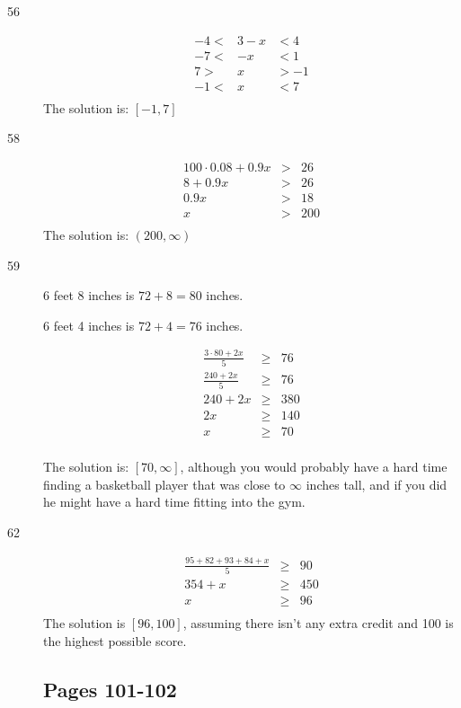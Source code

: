 \documentclass[fleqn,addpoints]{exam}
\begin{document}
\begin{description}
\item[56]
\begin{eqnarray*}
  -4 < & 3 - x & < 4 \\
  -7 < & -x & < 1 \\
  7 >  & x & > -1 \\
  -1 < & x & < 7 \\
\end{eqnarray*}
The solution is: \( [-1, 7] \)

\item[58]
\begin{eqnarray*}
  100 \cdot 0.08 + 0.9x &>& 26 \\
  8 + 0.9x &>& 26 \\
  0.9x &>& 18 \\
  x &>& 200 \\
\end{eqnarray*}
The solution is: \( (200, \infty) \)

\item[59]

6 feet 8 inches is $72 + 8 = 80$ inches.

6 feet 4 inches is $72 + 4 = 76$ inches.

\begin{eqnarray*}
  \frac{3 \cdot 80 + 2x}{5} &\geq& 76 \\
  \frac{240 + 2x}{5} &\geq& 76 \\
  240 + 2x &\geq& 380 \\
  2x &\geq& 140 \\
  x &\geq& 70 \\
\end{eqnarray*}

The solution is: \( [70, \infty] \), although you would probably have a hard time finding a basketball player
that was close to $\infty$ inches tall, and if you did he might have a hard time fitting into the gym.

\item[62]

\begin{eqnarray*}
  \frac{95 + 82 + 93 + 84 + x}{5} &\geq& 90 \\
  354 + x &\geq& 450 \\
  x &\geq& 96 \\
\end{eqnarray*}
The solution is \( [96, 100] \), assuming there isn't any extra credit and 100 is the highest possible score.

\subsection{Pages 101-102} 


\end{description}
\end{document}
